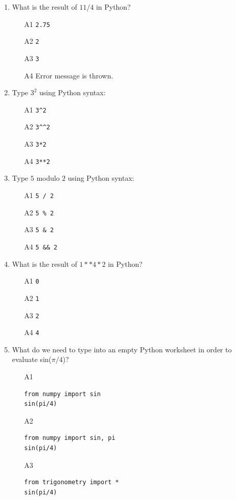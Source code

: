 \begin{enumerate}
\item What is the result of $11 / 4$ in Python?
\begin{enumerate}
\item[A1] {\tt 2.75}
\item[A2] {\tt 2}
\item[A3] {\tt 3}
\item[A4] Error message is thrown.
\end{enumerate}
\item Type $3^2$ using Python syntax:
\begin{enumerate}
\item[A1] {\tt 3\^{}2}
\item[A2] {\tt 3\^{}\^{}2}
\item[A3] {\tt 3*2}
\item[A4] {\tt 3**2}
\end{enumerate}
\item Type $5$ modulo $2$ using Python syntax:
\begin{enumerate}
\item[A1] {\tt 5 / 2}
\item[A2] {\tt 5 \% 2}
\item[A3] {\tt 5 \& 2}
\item[A4] {\tt 5 \&\& 2}
\end{enumerate}
\item What is the result of $1**4*2$ in Python?
\begin{enumerate}
\item[A1] {\tt 0}
\item[A2] {\tt 1}
\item[A3] {\tt 2}
\item[A4] {\tt 4}
\end{enumerate}
\item What do we need to type into an empty Python worksheet in order to evaluate sin($\pi/4$)?
\begin{enumerate}
\item[A1] 
\begin{verbatim}
from numpy import sin
sin(pi/4)
\end{verbatim}
\item[A2] 
\begin{verbatim}
from numpy import sin, pi
sin(pi/4)
\end{verbatim}
\item[A3] 
\begin{verbatim}
from trigonometry import *
sin(pi/4)
\end{verbatim}

\end{enumerate}
\end{enumerate}
